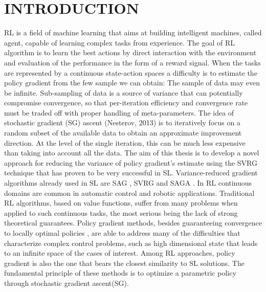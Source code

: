
\chapter{INTRODUCTION} \label{chap:aChapter}

\ac{RL} is a field of machine learning that aims at building intelligent machines, called agent, capable of learning complex tasks from experience.
The goal of \acs{RL} \citep{sutton1998reinforcement} algorithm is to learn the best actions by direct interaction with the environment and evaluation of the performance in the form of a reward signal.
When the tasks are represented by a continuous state-action spaces a difficulty is to estimate the policy gradient from the few sample we can obtain:  The sample of data may even be infinite. Sub-sampling of data is a source of variance that can potentially compromise convergence, so that per-iteration efficiency and convergence rate must be traded off with proper handling of meta-parameters.
The idea of stochastic gradient (SG) ascent (Nesterov, 2013) is to iteratively focus on a random subset of the available data to obtain an approximate improvement direction. At the level of the single iteration, this can be much less expensive than taking into account all the data.
The aim of this thesis is to develop a novel approach for reducing the variance of policy gradient's estimate using the \acs{SVRG}\cite{allen2016variance} technique that has proven to be very successful in \ac{SL}.\newline
Variance-reduced gradient algorithms already used in \acs{SL} are SAG \citep{roux2012stochastic}, SVRG \citep{allen2016variance} and SAGA \citep{defazio2014saga}.\newline
In \acs{RL} continuous domains are common in automatic control and robotic applications. Traditional RL algorithms, based on value functions, suffer from many problems when applied to such continuous tasks, the most serious being the lack of strong theoretical guarantees. Policy gradient methods, besides guaranteeing convergence to locally optimal policies \citep{sutton2000policy}, are able to address many of the difficulties that characterize complex control problems, such as high dimensional state that leads to an infinite space of the cases of interest. 
Among RL approaches, policy gradient is also the one that bears the closest similarity to \acs{SL} solutions. The fundamental principle of these methods is to optimize a parametric policy through stochastic gradient ascent(\acs{SG}).
